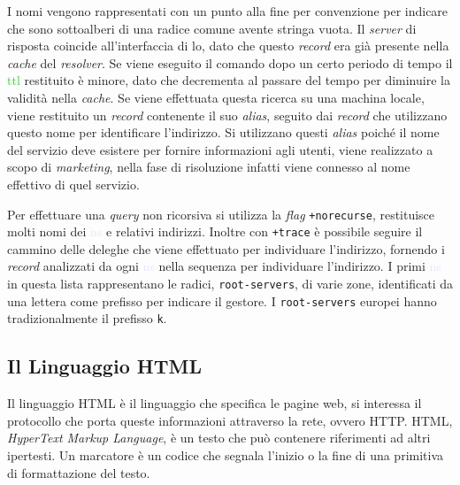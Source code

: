 \documentclass{article}
\numberwithin{equation}{subsection}
\begin{document}
I nomi vengono rappresentati con un punto alla fine per convenzione per indicare che sono sottoalberi di una radice comune avente stringa vuota. 
Il \textit{server} di risposta coincide all'interfaccia di lo, dato che questo \textit{record} era già presente nella \textit{cache} del \textit{resolver}. 
Se viene eseguito il comando dopo un certo periodo di tempo il \textcolor{LimeGreen}{ttl} restituito è minore, dato che decrementa al passare del tempo per diminuire la validità nella \textit{cache}. 
Se viene effettuata questa ricerca su una machina locale, viene restituito un \textit{record} contenente il suo \textit{alias}, seguito dai \textit{record} che utilizzano questo nome per identificare l'indirizzo. Si utilizzano questi \textit{alias} poiché il nome del servizio deve esistere per fornire informazioni agli utenti, viene realizzato a scopo di \textit{marketing}, nella fase di risoluzione infatti viene connesso al nome effettivo di quel servizio. 

Per effettuare una \textit{query} non ricorsiva si utilizza la \textit{flag} \verb|+norecurse|, restituisce molti nomi dei \textcolor{Lavender}{ns} e relativi indirizzi. Inoltre con \verb|+trace| è possibile seguire il cammino delle deleghe che viene effettuato per individuare l'indirizzo, fornendo i \textit{record} analizzati da ogni \textcolor{Lavender}{ns} nella sequenza per individuare l'indirizzo. I primi \textcolor{Lavender}{ns} in questa lista rappresentano le radici, \verb|root-servers|, di varie zone, identificati da una lettera come prefisso per indicare il gestore. I \verb|root-servers| europei hanno tradizionalmente il prefisso \verb|k|. 

\subsection{Il Linguaggio \textcolor{Peach}{HTML}}

Il linguaggio \textcolor{Peach}{HTML} è il linguaggio che specifica le pagine web, si interessa il protocollo che porta queste informazioni attraverso la rete, ovvero \textcolor{NavyBlue}{HTTP}. 
\textcolor{Peach}{HTML}, \textit{HyperText Markup Language}, è un testo che può contenere riferimenti ad altri ipertesti. Un marcatore è un codice che segnala l'inizio o la fine di una primitiva di 
formattazione del testo. 
\end{document}
